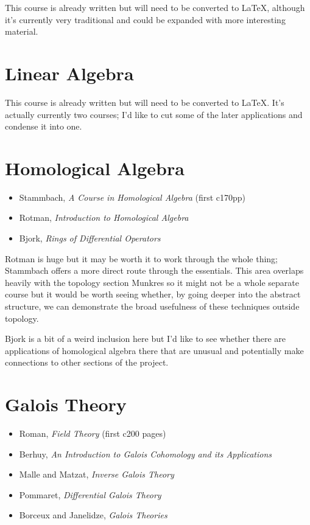 \documentclass[article]{article}
\begin{document}
This course is already written but will need to be converted to \LaTeX, although it's currently very traditional and could be expanded with more interesting material.


\section{Linear Algebra}

This course is already written but will need to be converted to \LaTeX. It's actually currently two courses; I'd like to cut some of the later applications and condense it into one.

\section{Homological Algebra}

\begin{itemize}
	\item{Stammbach, \textit{A Course in Homological Algebra} (first c170pp)}
	\item{Rotman, \textit{Introduction to Homological Algebra}}
	\item{Bjork, \textit{Rings of Differential Operators}}
\end{itemize}

Rotman is huge but it may be worth it to work through the whole thing; Stammbach offers a more direct route through the essentials. This area overlaps heavily with the topology section Munkres so it might not be a whole separate course but it would be worth seeing whether, by going deeper into the abstract structure, we can demonstrate the broad usefulness of these techniques outside topology.

Bjork is a bit of a weird inclusion here but I'd like to see whether there are applications of homological algebra there that are unusual and potentially make connections to other sections of the project.

\section{Galois Theory}

\begin{itemize}
	\item{Roman, \textit{Field Theory} (first c200 pages)}
	\item{Berhuy, \textit{An Introduction to Galois Cohomology and its Applications}}
	\item{Malle and Matzat, \textit{Inverse Galois Theory}}
	\item{Pommaret, \textit{Differential Galois Theory}}
	\item{Borceux and Janelidze, \textit{Galois Theories}}
\end{itemize}
\end{document}
